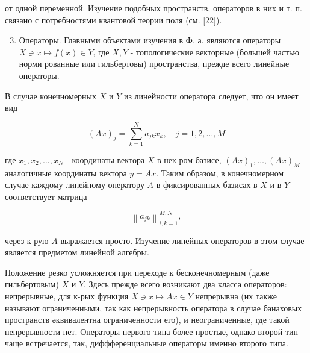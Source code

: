\documentclass[10pt]{article}
\begin{document}
от одной переменной. Изучение подобных пространств, операторов в них и т. п. связано с потребностями квантовой теории поля (см. [22]).



\begin{enumerate}

  \setcounter{enumi}{2}

  \item Операторы. Главными объектами изучения в Ф. а. являются операторы $X \ni x \mapsto f(x) \in Y$, где $X, Y$ - топологические векторные (большей частью норми рованные или гильбертовы) пространства, прежде всего линейные операторы.

\end{enumerate}



В случае конечномерных $X$ и $Y$ из линейности оператора следует, что он имеет вид



\[

(A x)_{j}=\sum_{k=1}^{N} a_{j k} x_{k}, \quad j=1,2, \ldots, M

\]



где $x_{1}, x_{2}, \ldots, x_{N}$ - координаты вектора $X$ в нек-ром базисе, $(A x)_{1}, \ldots,(A x)_{M}$ - аналогичные координаты вектора $y=A x$. Таким образом, в конечномерном случае каждому линейному оператору $A$ в фиксированных базисах в $X$ и в $Y$ соответствует матрица



\[

\left\|a_{j k}\right\|_{i, k=1}^{M, N},

\]



через к-рую $A$ выражается просто. Изучение линейных операторов в этом случае является предметом линейной алгебры.



Положение резко усложняется при переходе к бесконечномерным (даже гильбертовым) $X$ и $Y$. Здесь прежде всего возникают два класса операторов: непрерывные, для к-рых функция $X \ni x \mapsto A x \in Y$ непрерывна (их также называют ограниченными, так как непрерывность оператора в случае банаховых пространств әквивалентна ограниченности его), и неограниченные, где такой непрерывности нет. Операторы первого типа более простые, однако второй тип чаще встречается, так, диффференциальные операторы именно второго типа.
\end{document}

